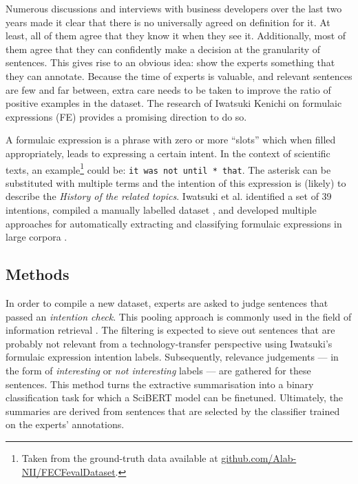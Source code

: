 Numerous discussions and interviews with business developers over the last two years made it clear that there is no universally agreed on definition for it. At least, all of them agree that they know it when they see it. Additionally, most of them agree that they can confidently make a decision at the granularity of sentences. This gives rise to an obvious idea: show the experts something that they can annotate. Because the time of experts is valuable, and relevant sentences are few and far between, extra care needs to be taken to improve the ratio of positive examples in the dataset. The research of Iwatsuki Kenichi on formulaic expressions (FE) \cite{iwatsuki2020evaluation,iwatsuki2021extraction,iwatsuki2021communicative,iwatsuki2022extraction} provides a promising direction to do so. 

A formulaic expression is a phrase with zero or more ``slots'' which when filled appropriately, leads to expressing a certain intent. In the context of scientific texts, an example\footnote{Taken from the ground-truth data available at \href{https://github.com/Alab-NII/FECFevalDataset/blob/master/human_evaluation/background.tsv}{github.com/Alab-NII/FECFevalDataset}.} could be: \texttt{it was not until * that}. The asterisk can be substituted with multiple terms and the intention of this expression is (likely) to describe the \textit{History of the related topics}. Iwatsuki et al. identified a set of 39 intentions, compiled a manually labelled dataset \cite{iwatsuki2020evaluation}, and developed multiple approaches for automatically extracting and classifying formulaic expressions in large corpora \cite{iwatsuki2021communicative,iwatsuki2022extraction}.

\subsection{Methods}

In order to compile a new dataset, experts are asked to judge sentences that passed an \textit{intention check}. This pooling approach is commonly used in the field of information retrieval \cite{schutze2008introduction}. The filtering is expected to sieve out sentences that are probably not relevant from a technology-transfer perspective using Iwatsuki's formulaic expression intention labels. Subsequently, relevance judgements --- in the form of \textit{interesting} or \textit{not interesting} labels --- are gathered for these sentences. This method turns the extractive summarisation into a binary classification task for which a SciBERT model \cite{beltagy2019scibert} can be finetuned. Ultimately, the summaries are derived from sentences that are selected by the classifier trained on the experts' annotations.

